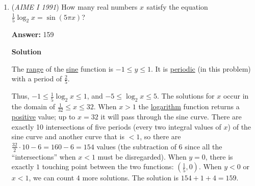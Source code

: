\begin{enumerate}
 Note: It may be more intuitive to equate $x=5y$ and then use test points to figure out which side of the inequality to lie on.

 



\textbf{Solution 6}

Notice the relation between $A_m$ and $A_{m+1}$. We have that: $A_{m+1}  = A_m \cdot \frac{1}{5} \cdot \frac{1000-m}{m+1}$. This is true because from $A_m$ to $A_{m+1}$ we have to multiply by $\frac{1}{5}=0.2$ once,and then we must resolve the factorial issue. To do this, we must realize that 

 
 \[{1000 \choose m+1} = \frac{1000!}{(m+1)!(1000-m-1)!} = \frac{1000 \cdots (1001-m)(1000-m)}{(m+1)!}\]and that
 \[{1000 \choose m} = \frac{1000!}{m!(1000-m)!} = \frac{1000 \cdots (1001-m)}{m!}\]

 \[\Longrightarrow {1000 \choose m} \cdot \frac{1000-m}{m+1}\]

 So now, we must find out for which $m$ is $1000-m< 5 \cdot (m+1)$ (when this happens the numerator is less than the denominator for the fraction $\frac{1000-m}{m+1}$ so then we will have $A_m > A_{m+1}$) Then we find that for all $m > 165.833333$, the above inequality ($1000-m< 5 \cdot (m+1)$) holds, so then $m=165$ so $k=m+1= \boxed{166}$.

 


	\item (\textit{AIME I 1991}) How many real numbers $x^{}_{}$ satisfy the equation $\frac{1}{5}\log_2 x = \sin (5\pi x)$?


 
 \textbf{Answer: }159



\textbf{Solution}

The \href{https://artofproblemsolving.com/wiki/index.php?title=Range}{range} of the \href{https://artofproblemsolving.com/wiki/index.php?title=Sine}{sine} function is $-1 \le y \le 1$. It is \href{https://artofproblemsolving.com/wiki/index.php?title=Periodic\_function}{periodic} (in this problem) with a period of $\frac{2}{5}$. 

 Thus, $-1 \le \frac{1}{5} \log_2 x \le 1$, and $-5 \le \log_2 x \le 5$. The solutions for $x$ occur in the domain of $\frac{1}{32} \le x \le 32$. When $x > 1$ the \href{https://artofproblemsolving.com/wiki/index.php?title=Logarithm}{logarithm} function returns a \href{https://artofproblemsolving.com/wiki/index.php?title=Positive}{positive} value; up to $x = 32$ it will pass through the sine curve. There are exactly 10 intersections of five periods (every two integral values of $x$) of the sine curve and another curve that is $< 1$, so there are $\frac{32}{2} \cdot 10 - 6 = 160 - 6 = 154$ values (the subtraction of 6 since all the “intersections” when $x < 1$ must be disregarded). When $y = 0$, there is exactly $1$ touching point between the two functions: $\left(\frac{1}{5},0\right)$. When $y < 0$ or $x < 1$, we can count $4$ more solutions. The solution is $154 + 1 + 4 = \boxed{159}$.


\end{enumerate}
